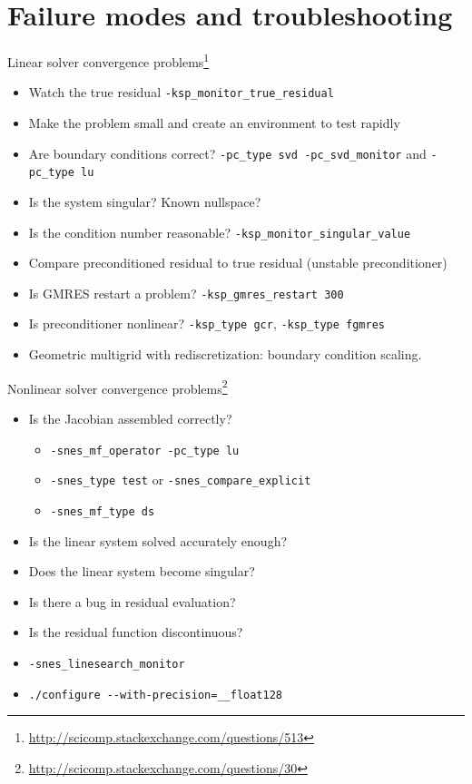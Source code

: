 \documentclass{beamer}
\begin{document}
\section{Failure modes and troubleshooting}

\begin{frame}[fragile]{Linear solver convergence problems\footnote{\url{http://scicomp.stackexchange.com/questions/513}}}
  \begin{itemize}
  \item Watch the true residual \verb|-ksp_monitor_true_residual|
  \item Make the problem small and create an environment to test rapidly
  \item Are boundary conditions correct? \verb|-pc_type svd -pc_svd_monitor| and \verb|-pc_type lu|
  \item Is the system singular? Known nullspace?
  \item Is the condition number reasonable? \verb|-ksp_monitor_singular_value|
  \item Compare preconditioned residual to true residual (unstable preconditioner)
  \item Is GMRES restart a problem? \verb|-ksp_gmres_restart 300|
  \item Is preconditioner nonlinear? \verb|-ksp_type gcr|, \verb|-ksp_type fgmres|
  \item Geometric multigrid with rediscretization: boundary condition scaling.
  \end{itemize}
\end{frame}
\begin{frame}[fragile]{Nonlinear solver convergence problems\footnote{\url{http://scicomp.stackexchange.com/questions/30}}}
  \begin{itemize}
  \item Is the Jacobian assembled correctly?
    \begin{itemize}
    \item \verb|-snes_mf_operator -pc_type lu|
    \item \verb|-snes_type test| or \verb|-snes_compare_explicit|
    \item \verb|-snes_mf_type ds|
    \end{itemize}
  \item Is the linear system solved accurately enough?
  \item Does the linear system become singular?
  \item Is there a bug in residual evaluation?
  \item Is the residual function discontinuous?
  \item \verb|-snes_linesearch_monitor|
  \item \verb|./configure --with-precision=__float128|
  \end{itemize}
\end{frame}
\end{document}
